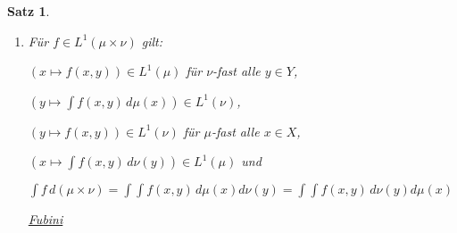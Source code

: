 \documentclass[11pt]{memoir}
\theoremstyle{changebreak}
\newtheorem{Satz}{Satz}[chapter]
\begin{document}
\begin{Satz}
\begin{enumerate}
	\item Für $f \in L^1(\mu \times \nu)$ gilt:
	\par
	$(x \mapsto f(x, y)) \in L^1(\mu)$ für $\nu$-fast alle $y \in Y$,
	\par
	$(y \mapsto \int f(x, y)\, d\mu(x)) \in L^1(\nu)$,
	\par
	$(y \mapsto f(x, y)) \in L^1(\nu)$ für $\mu$-fast alle $x \in X$,
	\par
	$(x \mapsto \int f(x, y) \, d\nu(y)) \in L^1(\mu)$ und
	\begin{center}
		$\int f \, d(\mu \times \nu) = \int \int f(x, y) \, d\mu(x)d\nu(y) = \int \int f(x, y) \, d\nu(y)d\mu(x)$
	\end{center}
	\emph{\underline{Fubini}}
\end{enumerate}
\end{Satz}
\end{document}
